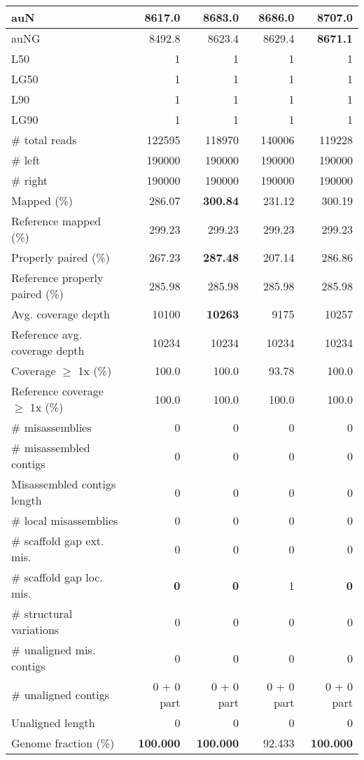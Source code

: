 \documentclass[12pt,a4paper]{article}
\begin{document}
\begin{table}[ht]
\begin{center}
\begin{tabular}{|l*{4}{|r}|}
auN & 8617.0 & 8683.0 & 8686.0 & {\bf 8707.0} \\ \hline
auNG & 8492.8 & 8623.4 & 8629.4 & {\bf 8671.1} \\ \hline
L50 & 1 & 1 & 1 & 1 \\ \hline
LG50 & 1 & 1 & 1 & 1 \\ \hline
L90 & 1 & 1 & 1 & 1 \\ \hline
LG90 & 1 & 1 & 1 & 1 \\ \hline
\# total reads & 122595 & 118970 & 140006 & 119228 \\ \hline
\# left & 190000 & 190000 & 190000 & 190000 \\ \hline
\# right & 190000 & 190000 & 190000 & 190000 \\ \hline
Mapped (\%) & 286.07 & {\bf 300.84} & 231.12 & 300.19 \\ \hline
Reference mapped (\%) & 299.23 & 299.23 & 299.23 & 299.23 \\ \hline
Properly paired (\%) & 267.23 & {\bf 287.48} & 207.14 & 286.86 \\ \hline
Reference properly paired (\%) & 285.98 & 285.98 & 285.98 & 285.98 \\ \hline
Avg. coverage depth & 10100 & {\bf 10263} & 9175 & 10257 \\ \hline
Reference avg. coverage depth & 10234 & 10234 & 10234 & 10234 \\ \hline
Coverage $\geq$ 1x (\%) & 100.0 & 100.0 & 93.78 & 100.0 \\ \hline
Reference coverage $\geq$ 1x (\%) & 100.0 & 100.0 & 100.0 & 100.0 \\ \hline
\# misassemblies & 0 & 0 & 0 & 0 \\ \hline
\# misassembled contigs & 0 & 0 & 0 & 0 \\ \hline
Misassembled contigs length & 0 & 0 & 0 & 0 \\ \hline
\# local misassemblies & 0 & 0 & 0 & 0 \\ \hline
\# scaffold gap ext. mis. & 0 & 0 & 0 & 0 \\ \hline
\# scaffold gap loc. mis. & {\bf 0} & {\bf 0} & 1 & {\bf 0} \\ \hline
\# structural variations & 0 & 0 & 0 & 0 \\ \hline
\# unaligned mis. contigs & 0 & 0 & 0 & 0 \\ \hline
\# unaligned contigs & 0 + 0 part & 0 + 0 part & 0 + 0 part & 0 + 0 part \\ \hline
Unaligned length & 0 & 0 & 0 & 0 \\ \hline
Genome fraction (\%) & {\bf 100.000} & {\bf 100.000} & 92.433 & {\bf 100.000} \\ \hline

\end{tabular}
\end{center}
\end{table}
\end{document}
